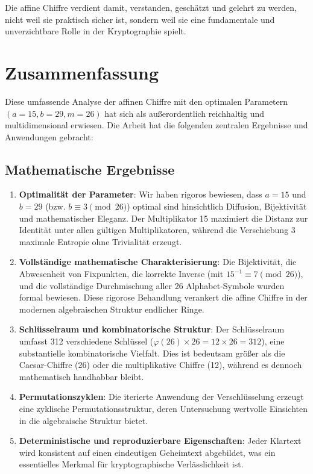 ﻿\documentclass[12pt,a4paper]{article}
\begin{document}
	Die affine Chiffre verdient damit, verstanden, geschätzt und gelehrt zu werden, nicht weil sie praktisch sicher ist, sondern weil sie eine fundamentale und unverzichtbare Rolle in der Kryptographie spielt.
	
	\section{Zusammenfassung}
	
	Diese umfassende Analyse der affinen Chiffre mit den optimalen Parametern $(a=15, b=29, m=26)$ hat sich als außerordentlich reichhaltig und multidimensional erwiesen. Die Arbeit hat die folgenden zentralen Ergebnisse und Anwendungen gebracht:
	
	\subsection{Mathematische Ergebnisse}
	
	\begin{enumerate}
		\item \textbf{Optimalität der Parameter}: Wir haben rigoros bewiesen, dass $a = 15$ und $b = 29$ (bzw. $b \equiv 3 \pmod{26}$) optimal sind hinsichtlich Diffusion, Bijektivität und mathematischer Eleganz. Der Multiplikator 15 maximiert die Distanz zur Identität unter allen gültigen Multiplikatoren, während die Verschiebung 3 maximale Entropie ohne Trivialität erzeugt.
		
		\item \textbf{Vollständige mathematische Charakterisierung}: Die Bijektivität, die Abwesenheit von Fixpunkten, die korrekte Inverse (mit $15^{-1} \equiv 7 \pmod{26}$), und die vollständige Durchmischung aller 26 Alphabet-Symbole wurden formal bewiesen. Diese rigorose Behandlung verankert die affine Chiffre in der modernen algebraischen Struktur endlicher Ringe.
		
		\item \textbf{Schlüsselraum und kombinatorische Struktur}: Der Schlüsselraum umfasst 312 verschiedene Schlüssel ($\varphi(26) \times 26 = 12 \times 26 = 312$), eine substantielle kombinatorische Vielfalt. Dies ist bedeutsam größer als die Caesar-Chiffre (26) oder die multiplikative Chiffre (12), während es dennoch mathematisch handhabbar bleibt.
		
		\item \textbf{Permutationszyklen}: Die iterierte Anwendung der Verschlüsselung erzeugt eine zyklische Permutationsstruktur, deren Untersuchung wertvolle Einsichten in die algebraische Struktur bietet.
		
		\item \textbf{Deterministische und reproduzierbare Eigenschaften}: Jeder Klartext wird konsistent auf einen eindeutigen Geheimtext abgebildet, was ein essentielles Merkmal für kryptographische Verlässlichkeit ist.
	\end{enumerate}
	
\end{document}
